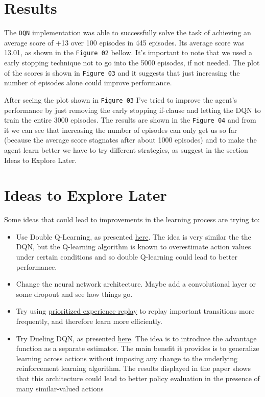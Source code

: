 \documentclass[
]{article}
\begin{document}
\pagebreak

\hypertarget{results}{%
\section{Results}\label{results}}

The \texttt{DQN} implementation was able to successfully solve the task
of achieving an average score of +13 over 100 episodes in 445 episodes.
Its average score was 13.01, as shown in the \texttt{Figure\ 02} bellow.
It's important to note that we used a early stopping technique not to go
into the 5000 episodes, if not needed. The plot of the scores is shown
in \texttt{Figure\ 03} and it suggests that just increasing the number
of episodes alone could improve performance.

After seeing the plot shown in \texttt{Figure\ 03} I've tried to improve
the agent's performance by just removing the early stopping if-clause
and letting the DQN to train the entire 3000 episodes. The results are
shown in the \texttt{Figure\ 04} and from it we can see that increasing
the number of episodes can only get us so far (because the average score
stagnates after about 1000 episodes) and to make the agent learn better
we have to try different strategies, as suggest in the section Ideas to
Explore Later.

\pagebreak

\hypertarget{ideas-to-explore-later}{%
\section{Ideas to Explore Later}\label{ideas-to-explore-later}}

Some ideas that could lead to improvements in the learning process are
trying to:

\begin{itemize}
\item
  Use Double Q-Learning, as presented
  \href{https://arxiv.org/pdf/1509.06461}{here}. The idea is very
  similar the the DQN, but the Q-learning algorithm is known to
  overestimate action values under certain conditions and so double
  Q-learning could lead to better performance.
\item
  Change the neural network architecture. Maybe add a convolutional
  layer or some dropout and see how things go.
\item
  Try using \href{https://arxiv.org/pdf/1511.05952}{prioritized
  experience replay} to replay important transitions more frequently,
  and therefore learn more efficiently.
\item
  Try Dueling DQN, as presented
  \href{https://arxiv.org/pdf/1511.06581}{here}. The idea is to
  introduce the advantage function as a separate estimator. The main
  benefit it provides is to generalize learning across actions without
  imposing any change to the underlying reinforcement learning
  algorithm. The results displayed in the paper shows that this
  architecture could lead to better policy evaluation in the presence of
  many similar-valued actions
\end{itemize}
\end{document}
